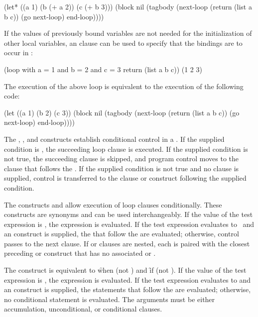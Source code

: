 \code
 (let* ((a 1)
        (b (+ a 2))
        (c (+ b 3)))
   (block nil
     (tagbody
         (next-loop (return (list a b c))
                    (go next-loop)
                    end-loop))))
\endcode
 

If the values of previously bound variables are not needed
for the initialization of other local variables, an 
 clause can be used to 
specify that the bindings are to occur in :
 
\code
 (loop with a = 1 
       and b = 2 
       and c = 3
       return (list a b c))
\EV (1 2 3)
\endcode
 
The execution of the above loop is equivalent to the execution of
the following code:
 
\code
 (let ((a 1)
       (b 2)
       (c 3))
   (block nil
     (tagbody
         (next-loop (return (list a b c))
                    (go next-loop)
                    end-loop))))
\endcode


The  
, , and 
constructs 
establish conditional control in a .
If the supplied condition is , the succeeding loop clause
is executed.  If the supplied condition is not true, the succeeding clause is
skipped, and program control moves to the clause that follows 
the  .  If the supplied condition is not true and no
 clause is supplied, control is transferred to the 
clause or construct following the supplied condition.

The constructs  and  allow execution of 
loop clauses conditionally.  These constructs are synonyms and
can be used interchangeably.
 If the value of the test expression  is , the expression
 is evaluated. If the test expression evaluates to \nil\
and an  construct is supplied, the  that follow the
 are evaluated; otherwise, control passes to the next clause.
 If  or  clauses are nested, each  is
paired with the closest preceding \loopref{if} or \loopref{when} construct that has
no associated \loopref{else} or \loopref{end}.

The  construct is equivalent to \f{when (not )}
and \f{if (not )}.
If the value of the test expression \param{form} is \nil, the expression
\param{clause1} is evaluated. If the test expression evaluates to 
\term{non-nil} and an  construct is supplied, the statements that follow the
\loopref{else} are evaluated; otherwise, no conditional statement is evaluated.
 The \param{clause} arguments must be either accumulation, unconditional,
or conditional clauses.  
     
